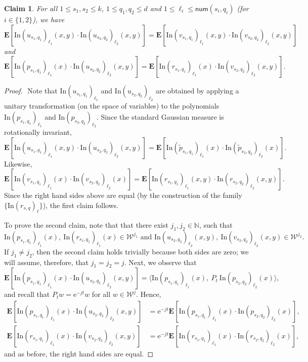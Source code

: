 \documentclass[11pt]{article}
\numberwithin{equation}{section}
\newtheorem{claim}[theorem]{Claim}
\theoremstyle{definition}
\theoremstyle{plain}
\newcommand{\eee}{\mathrm e}
\newcommand{\Inner}{\mathrm{In}}
\begin{document}
\begin{claim}\label{clm:const-corr}
For all $1 \le s_1, s_2 \le k$, $1 \le q_1, q_2 \le d$ and $1 \le \ell_i \le \mathsf{num}(s_i, q_i)$ (for $i \in \{1,2\}$), we have
\[
\mathbf{E}[\Inner(u_{s_1,q_1})_{\ell_1}(x,y) \cdot \Inner(u_{s_2,q_2})_{\ell_2}(x,y) ] = \mathbf{E}[\Inner(v_{s_1,q_1})_{\ell_1}(x,y) \cdot \Inner(v_{s_2,q_2})_{\ell_2}(x,y) ]
\]
and
\[
\mathbf{E}[\Inner(p_{s_1,q_1})_{\ell_1}(x) \cdot \Inner(u_{s_2,q_2})_{\ell_2}(x,y) ] = \mathbf{E}[\Inner(r_{s_1,q_1})_{\ell_1}(x) \cdot \Inner(v_{s_2,q_2})_{\ell_2}(x,y) ].
\]
\end{claim}
\begin{proof} $ $
Note that $\Inner(u_{s_1,q_1})_{\ell_1}$ and 
$\Inner(u_{s_2,q_2})_{\ell_2}$ are obtained by applying a unitary transformation (on the space of variables) to the polynomials $\Inner(p_{s_1,q_1})_{\ell_1}$ and 
$\Inner(p_{s_2,q_2})_{\ell_2}$. Since the standard Gaussian measure is rotationally invariant,
\[
\mathbf{E}[\Inner(u_{s_1,q_1})_{\ell_1}(x,y) \cdot \Inner(u_{s_2,q_2})_{\ell_2}(x,y) ] = \mathbf{E}[\Inner(\tilde p_{s_1,q_1})_{\ell_1}(x) \cdot \Inner(\tilde p_{s_2,q_2})_{\ell_2}(x) ].
\]
Likewise, 
\[
\mathbf{E}[\Inner(v_{s_1,q_1})_{\ell_1}(x) \cdot \Inner(v_{s_2,q_2})_{\ell_2}(x) ] = \mathbf{E}[\Inner(r_{s_1,q_1})_{\ell_1}(x,y) \cdot \Inner(r_{s_2,q_2})_{\ell_2}(x,y) ].
\]
Since the right hand sides above are equal (by the construction of the family $\{\Inner(r_{s,q})_{\ell}\}$), the first claim follows.

To prove the second claim, note that that there exist $j_1, j_2 \in \mathbb{N}$, such that 
$$
\Inner(p_{s_1,q_1})_{\ell_1}(x), \ \Inner(r_{s_1,q_1})_{\ell_1}(x) \in \mathcal{W}^{j_1} \text{ and } \Inner(u_{s_2,q_2})_{\ell_2}(x,y), \ \Inner(v_{s_2,q_2})_{\ell_2}(x,y) \in \mathcal{W}^{j_2}. 
$$
If $j_1 \ne j_2$, then the second claim holds trivially because both sides are zero;
we will assume, therefore, that $j_1 = j_2 = j$.
Next, we observe that 
\[
\mathbf{E}[\Inner(p_{s_1,q_1})_{\ell_1}(x) \cdot \Inner(u_{s_2,q_2})_{\ell_2}(x,y) ]  = \langle \Inner(p_{s_1,q_1})_{\ell_1}(x),\  P_t \  \Inner(p_{s_2,q_2})_{\ell_2}(x) \rangle,
\]
and recall that $P_t w = \eee^{-jt} w$ for all $w \in \mathcal{W}^j$. Hence,
\begin{align*}
    \mathbf{E}[\Inner(p_{s_1,q_1})_{\ell_1}(x) \cdot \Inner(u_{s_2,q_2})_{\ell_2}(x,y) ] &= \eee^{-jt} \mathbf{E}[\Inner(p_{s_1,q_1})_{\ell_1}(x) \cdot \Inner(p_{s_2,q_2})_{\ell_2}(x) ], \\
\mathbf{E}[\Inner(r_{s_1,q_1})_{\ell_1}(x) \cdot \Inner(v_{s_2,q_2})_{\ell_2}(x,y) ] 
                                                                                         &= \eee^{-jt} \mathbf{E}[\Inner(r_{s_1,q_1})_{\ell_1}(x) \cdot \Inner(r_{s_2,q_2})_{\ell_2}(x) ],
\end{align*}
and as before, the right hand sides are equal.
\end{proof}
\end{document}
